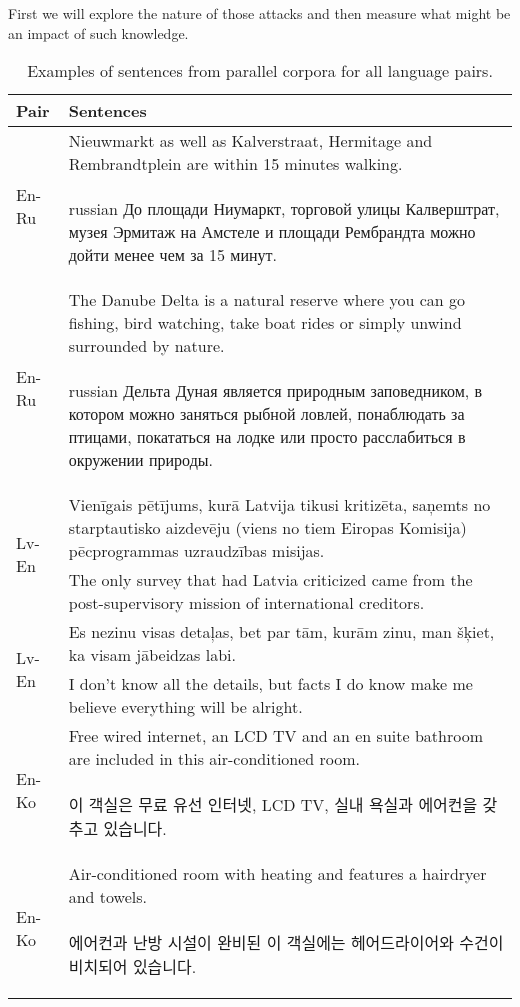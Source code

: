 \documentclass[]{article}
\begin{document}
First we will explore the nature of those attacks and then measure what might be an impact of such knowledge.

\begin{table}[h!]
\begin{center}
\begin{tabular}{ l p{10cm} }
Pair & Sentences \\
\hline
\multirow{2}{4em}{En-Ru}
& Nieuwmarkt as well as Kalverstraat, Hermitage and Rembrandtplein are within 15 minutes walking. \\
& \begin{otherlanguage*}{russian}
До площади Ниумаркт, торговой улицы Калверштрат, музея Эрмитаж на Амстеле и площади Рембрандта можно дойти менее чем за 15 минут.
\end{otherlanguage*} \\
\hline
\multirow{2}{4em}{En-Ru}
& The Danube Delta is a natural reserve where you can go fishing, bird watching, take boat rides or simply unwind surrounded by nature. \\
& \begin{otherlanguage*}{russian}
Дельта Дуная является природным заповедником, в котором можно заняться рыбной ловлей, понаблюдать за птицами, покататься на лодке или просто расслабиться в окружении природы. \end{otherlanguage*} \\
\hline
\multirow{2}{4em}{Lv-En}
& Vienīgais pētījums, kurā Latvija tikusi kritizēta, saņemts no starptautisko aizdevēju (viens no tiem Eiropas Komisija) pēcprogrammas uzraudzības misijas. \\
& The only survey that had Latvia criticized came from the post-supervisory mission of international creditors. \\
\hline
\multirow{2}{4em}{Lv-En}
& Es nezinu visas detaļas, bet par tām, kurām zinu, man šķiet, ka visam jābeidzas labi. \\
& I don’t know all the details, but facts I do know make me believe everything will be alright. \\
\hline
\multirow{2}{4em}{En-Ko}
& Free wired internet, an LCD TV and an en suite bathroom are included in this air-conditioned room. \\
& \begin{CJK}{UTF8}{mj}
  이 객실은 무료 유선 인터넷, LCD TV, 실내 욕실과 에어컨을 갖추고 있습니다.
  \end{CJK} \\
\hline
\multirow{2}{4em}{En-Ko}
& Air-conditioned room with heating and features a hairdryer and towels. \\
& \begin{CJK}{UTF8}{mj}
  에어컨과 난방 시설이 완비된 이 객실에는 헤어드라이어와 수건이 비치되어 있습니다.
  \end{CJK}
\end{tabular}
\end{center}
\caption{Examples of sentences from parallel corpora for all language pairs.}
\label{table:corpora_examples}
\end{table}
\end{document}
